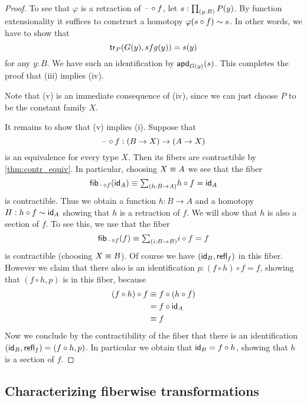 \begin{proof}
To see that $\varphi$ is a retraction of $\blank\circ f$, let $s:\prd{y:B}P(y)$. By function extensionality it suffices to construct a homotopy $\varphi(s\circ f)\htpy s$. In other words, we have to show that
\begin{equation*}
\tr_P(G(y),sfg(y))=s(y)
\end{equation*}
for any $y:B$. We have such an identification by $\apd{G(y)}{s}$. This completes the proof that (iii) implies (iv).

Note that (v) is an immediate consequence of (iv), since we can just choose $P$ to be the constant family $X$.

It remains to show that (v) implies (i). Suppose that
\begin{equation*}
\blank\circ f:(B\to X)\to (A\to X)
\end{equation*}
is an equivalence for every type $X$. Then its fibers are contractible by \cref{thm:contr_equiv}. In particular, choosing $X\jdeq A$ we see that the fiber
\begin{equation*}
\fib{\blank\circ f}{\idfunc[A]}\jdeq \sm{h:B\to A}h\circ f=\idfunc[A]
\end{equation*}
is contractible. Thus we obtain a function $h:B\to A$ and a homotopy $H:h\circ f\htpy\idfunc[A]$ showing that $h$ is a retraction of $f$. We will show that $h$ is also a section of $f$. To see this, we use that the fiber
\begin{equation*}
\fib{\blank\circ f}{f}\jdeq \sm{i:B\to B} i\circ f=f
\end{equation*}
is contractible (choosing $X\jdeq B$). 
Of course we have $(\idfunc[B],\refl{f})$ in this fiber. However we claim that there also is an identification $p:(f\circ h)\circ f=f$, showing that $(f\circ h,p)$ is in this fiber, because
\begin{align*}
(f\circ h)\circ f & \jdeq f\circ (h\circ f) \\
& = f\circ \idfunc[A] \\
& \jdeq f
\end{align*}
Now we conclude by the contractibility of the fiber that there is an identification $(\idfunc[B],\refl{f})=(f\circ h,p)$. In particular we obtain that $\idfunc[B]=f\circ h$, showing that $h$ is a section of $f$.
\end{proof}

\subsection{Characterizing fiberwise transformations}

